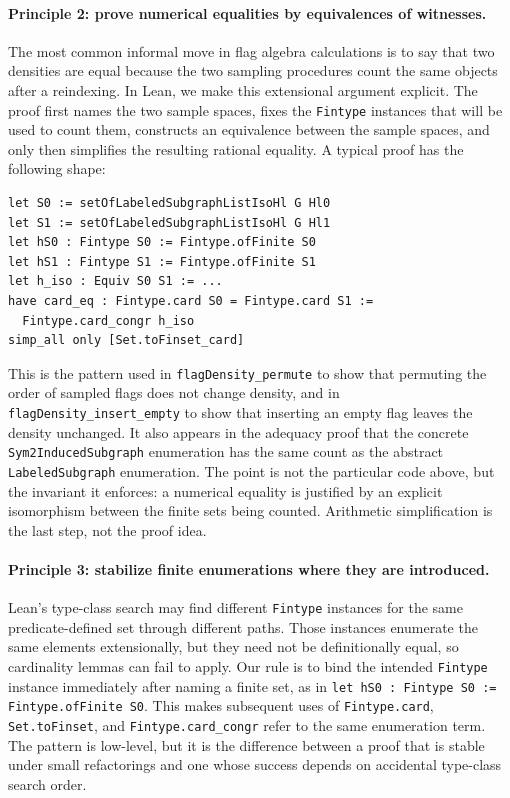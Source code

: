 \documentclass{article}
\newcommand{\lean}[1]{\texttt{#1}}
\begin{document}
\paragraph{Principle 2: prove numerical equalities by equivalences of witnesses.}
The most common informal move in flag algebra calculations is to say that two
densities are equal because the two sampling procedures count the same objects
after a reindexing.  In Lean, we make this extensional argument explicit.  The
proof first names the two sample spaces, fixes the \lean{Fintype} instances
that will be used to count them, constructs an equivalence between the sample
spaces, and only then simplifies the resulting rational equality.  A typical
proof has the following shape:
\begin{lstlisting}
let S0 := setOfLabeledSubgraphListIsoHl G Hl0
let S1 := setOfLabeledSubgraphListIsoHl G Hl1
let hS0 : Fintype S0 := Fintype.ofFinite S0
let hS1 : Fintype S1 := Fintype.ofFinite S1
let h_iso : Equiv S0 S1 := ...
have card_eq : Fintype.card S0 = Fintype.card S1 :=
  Fintype.card_congr h_iso
simp_all only [Set.toFinset_card]
\end{lstlisting}
This is the pattern used in \lean{flagDensity\_permute} to show that
permuting the order of sampled flags does not change density, and in
\lean{flagDensity\_insert\_empty} to show that inserting an empty flag leaves
the density unchanged.  It also appears in the adequacy proof that the concrete
\lean{Sym2InducedSubgraph} enumeration has the same count as the abstract
\lean{LabeledSubgraph} enumeration.  The point is not the particular code
above, but the invariant it enforces: a numerical equality is justified by an
explicit isomorphism between the finite sets being counted.  Arithmetic
simplification is the last step, not the proof idea.

\paragraph{Principle 3: stabilize finite enumerations where they are introduced.}
Lean's type-class search may find different \lean{Fintype} instances for the
same predicate-defined set through different paths.  Those instances enumerate
the same elements extensionally, but they need not be definitionally equal, so
cardinality lemmas can fail to apply.  Our rule is to bind the intended
\lean{Fintype} instance immediately after naming a finite set, as in
\lean{let hS0 : Fintype S0 := Fintype.ofFinite S0}.  This makes subsequent
uses of \lean{Fintype.card}, \lean{Set.toFinset}, and
\lean{Fintype.card\_congr} refer to the same enumeration term.  The pattern is
low-level, but it is the difference between a proof that is stable under small
refactorings and one whose success depends on accidental type-class search
order.
\end{document}
